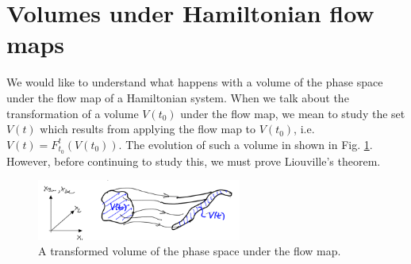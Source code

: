 \section{Volumes under Hamiltonian flow maps}
We would like to understand what happens with a volume of the phase space under the flow map of a Hamiltonian system. When we talk about the transformation of a volume $V(t_0)$ under the flow map, we mean to study the set $V(t)$ which results from applying the flow map to $V(t_0)$, i.e. $V(t) = F_{t_0}^{t}(V(t_0))$. The evolution of such a volume in shown in Fig. \ref{fig:vol_change}. However, before continuing to study this, we must prove Liouville's theorem.
\begin{figure}[h!]
	\centering
	\includegraphics[width=0.6\textwidth]{figures/ch8/6vol_change.png}
	\caption{A transformed volume of the phase space under the flow map.}
	\label{fig:vol_change}
\end{figure}

